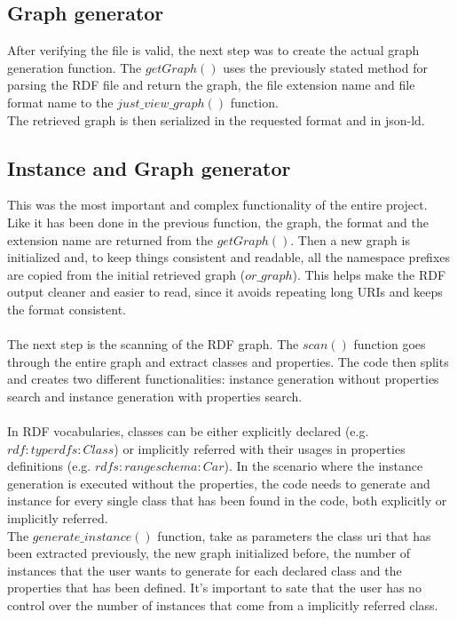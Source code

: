 \subsection{Graph generator}
After verifying the file is valid, the next step was to create the actual graph generation function. The $getGraph()$ uses the previously stated method for parsing the RDF file and return the graph, the file extension name and file format name to the $just\_view\_graph()$ function. 
\\
The retrieved graph is then serialized in the requested format and in json-ld.

\subsection{Instance and Graph generator}
This was the most important and complex functionality of the entire project. 
Like it has been done in the previous function, the graph, the format and the extension name are returned from the $getGraph()$.
Then a new graph is initialized and, to keep things consistent and readable, all the namespace prefixes are copied from the initial retrieved graph ($or\_graph$).
This helps make the RDF output cleaner and easier to read, since it avoids repeating long URIs and keeps the format consistent.
\\
\\
The next step is the scanning of the RDF graph. The $scan()$ function goes through the entire graph and extract classes and properties. The code then splits and creates two different functionalities: instance generation without properties search and instance generation with properties search.
\\
\\
In RDF vocabularies, classes can be either explicitly declared (e.g. $rdf:type rdfs:Class$) or implicitly referred with their usages in properties definitions (e.g. $rdfs:range schema:Car$).
In the scenario where the instance generation is executed without the properties, the code needs to generate and instance for every single class that has been found in the code, both explicitly or implicitly referred. 
\\
The $generate\_instance()$ function, take as parameters the class uri that has been extracted previously, the new graph initialized before, the number of instances that the user wants to generate for each declared class and the properties that has been defined. 
It's important to sate that the user has no control over the number of instances that come from a implicitly referred class.
